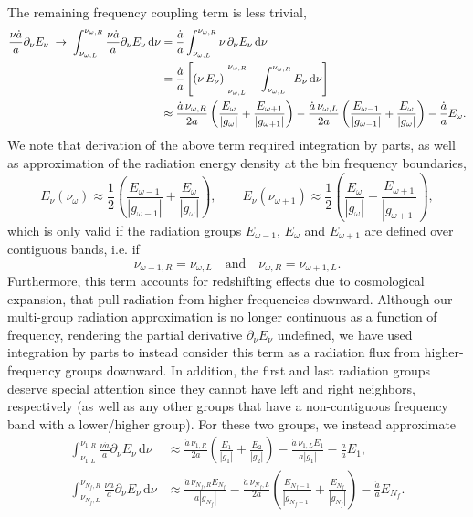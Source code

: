 \documentclass[10pt]{article}
\renewcommand{\(}{\left(}
\renewcommand{\)}{\right)}
\newcommand{\adot}{\dot{a}}
\newcommand{\Enu}{E_{\nu}}
\begin{document}
The remaining frequency coupling term is less trivial,
\begin{align}
\notag
   \frac{\nu \adot}{a}\partial_{\nu}\Enu \;\rightarrow\;
   \int_{\nu_{\omega,L}}^{\nu_{\omega,R}} \frac{\nu \adot}{a}\partial_{\nu}\Enu\,\mathrm d\nu
   &=
   \frac{\adot}{a} \int_{\nu_{\omega,L}}^{\nu_{\omega,R}} \nu\,\partial_{\nu}\Enu\,\mathrm d\nu \\
\label{eq:multigroup_redshifting}
   &=
   \frac{\adot}{a}
   \left[(\nu\,\Enu)\bigg\vert_{\nu_{\omega,L}}^{\nu_{\omega,R}} - \int_{\nu_{\omega,L}}^{\nu_{\omega,R}} \Enu\,\mathrm d\nu\right]\\
\notag
   &\approx
   \frac{\adot\, \nu_{\omega,R}}{2a}\left(\frac{E_{\omega}}{|g_{\omega}|} + \frac{E_{\omega+1}}{|g_{\omega+1}|}\right) -
   \frac{\adot\, \nu_{\omega,L}}{2a}\left(\frac{E_{\omega-1}}{|g_{\omega-1}|}+\frac{E_{\omega}}{|g_{\omega}|}\right) - 
   \frac{\adot}{a}E_{\omega}.
\end{align}
We note that derivation of the above term required integration by
parts, as well as approximation of the radiation energy density at the
bin frequency boundaries, 
\[
   \Enu(\nu_{\omega}) \approx \frac12\left(\frac{E_{\omega-1}}{|g_{\omega-1}|}+\frac{E_{\omega}}{|g_{\omega}|}\right), \qquad
   \Enu(\nu_{\omega+1}) \approx \frac12\left(\frac{E_{\omega}}{|g_{\omega}|} + \frac{E_{\omega+1}}{|g_{\omega+1}|}\right),
\]
which is only valid if the radiation groups $E_{\omega-1}$,
$E_{\omega}$ and $E_{\omega+1}$ are defined over contiguous bands,
i.e. if
\begin{equation}
\label{eq:contiguous_bands}
   \nu_{\omega-1,R} = \nu_{\omega,L} \quad\text{and}\quad
   \nu_{\omega,R} = \nu_{\omega+1,L}.
\end{equation}
Furthermore, this term accounts for redshifting effects due to
cosmological expansion, that pull radiation from higher frequencies
downward.  Although our multi-group radiation approximation is no
longer continuous as a function of frequency, rendering the partial
derivative $\partial_\nu\Enu$ undefined, we have used integration by
parts to instead consider this term as a radiation flux from
higher-frequency groups downward.  In addition, the first and last
radiation groups deserve special attention since they cannot have
left and right neighbors, respectively (as well as any other groups
that have a non-contiguous frequency band with a lower/higher group).
For these two groups, we instead approximate 
\begin{align}
 \label{eq:multigroup_redshifting_left}
   \int_{\nu_{1,L}}^{\nu_{1,R}} \frac{\nu \adot}{a}\partial_{\nu}\Enu\,\mathrm d\nu
   &\approx
   \frac{\adot\, \nu_{1,R}}{2a}\left(\frac{E_1}{|g_1|} + \frac{E_2}{|g_2|}\right) -
   \frac{\adot\, \nu_{1,L} E_1}{a|g_1|} - \frac{\adot}{a}E_1,
\\
 \label{eq:multigroup_redshifting_right}
   \int_{\nu_{N_f,L}}^{\nu_{N_f,R}} \frac{\nu \adot}{a}\partial_{\nu}\Enu\,\mathrm d\nu
   &\approx
   \frac{\adot\, \nu_{N_f,R} E_{N_f}}{a|g_{N_f}|} -
   \frac{\adot\, \nu_{N_f,L}}{2a}\left(\frac{E_{N_f-1}}{|g_{N_f-1}|}+\frac{E_{N_f}}{|g_{N_f}|}\right) - 
   \frac{\adot}{a}E_{N_f}.
\end{align}
\end{document}
